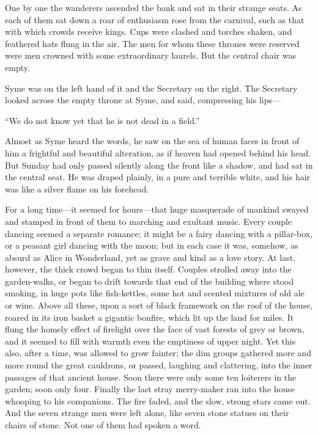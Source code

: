 \documentclass{book}
\begin{document}
One by one the wanderers ascended the bank and sat in their strange seats. As each of them sat down a roar of enthusiasm rose from the carnival, such as that with which crowds receive kings. Cups were clashed and torches shaken, and feathered hats flung in the air. The men for whom these thrones were reserved were men crowned with some extraordinary laurels. But the central chair was empty.

Syme was on the left hand of it and the Secretary on the right. The Secretary looked across the empty throne at Syme, and said, compressing his lips—

“We do not know yet that he is not dead in a field.”

Almost as Syme heard the words, he saw on the sea of human faces in front of him a frightful and beautiful alteration, as if heaven had opened behind his head. But Sunday had only passed silently along the front like a shadow, and had sat in the central seat. He was draped plainly, in a pure and terrible white, and his hair was like a silver flame on his forehead.

For a long time—it seemed for hours—that huge masquerade of mankind swayed and stamped in front of them to marching and exultant music. Every couple dancing seemed a separate romance; it might be a fairy dancing with a pillar-box, or a peasant girl dancing with the moon; but in each case it was, somehow, as absurd as Alice in Wonderland, yet as grave and kind as a love story. At last, however, the thick crowd began to thin itself. Couples strolled away into the garden-walks, or began to drift towards that end of the building where stood smoking, in huge pots like fish-kettles, some hot and scented mixtures of old ale or wine. Above all these, upon a sort of black framework on the roof of the house, roared in its iron basket a gigantic bonfire, which lit up the land for miles. It flung the homely effect of firelight over the face of vast forests of grey or brown, and it seemed to fill with warmth even the emptiness of upper night. Yet this also, after a time, was allowed to grow fainter; the dim groups gathered more and more round the great cauldrons, or passed, laughing and clattering, into the inner passages of that ancient house. Soon there were only some ten loiterers in the garden; soon only four. Finally the last stray merry-maker ran into the house whooping to his companions. The fire faded, and the slow, strong stars came out. And the seven strange men were left alone, like seven stone statues on their chairs of stone. Not one of them had spoken a word.
\end{document}
